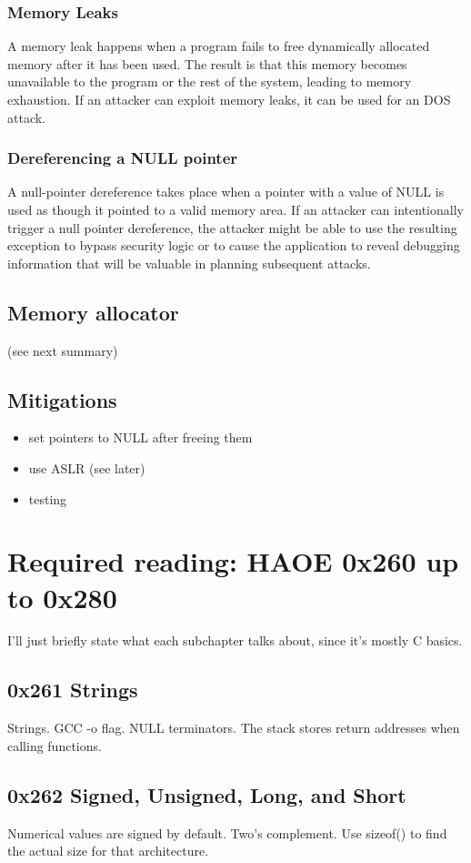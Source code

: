 \documentclass[letterpaper]{article}
\begin{document}
\subsubsection{Memory Leaks}
A memory leak happens when a program fails to free dynamically allocated memory after it has been used. The result is that this memory becomes unavailable to the program or the rest of the system, leading to memory exhaustion. If an attacker can exploit memory leaks, it can be used for an DOS attack.

\subsubsection{Dereferencing a NULL pointer}
A null-pointer dereference takes place when a pointer with a value of NULL is used as though it pointed to a valid memory area. If an attacker can intentionally trigger a null pointer dereference, the attacker might be able to use the resulting exception to bypass security logic or to cause the application to reveal debugging information that will be valuable in planning subsequent attacks.

\subsection{Memory allocator}
(see next summary)

\subsection{Mitigations}
\begin{itemize}
\item set pointers to NULL after freeing them
\item use ASLR (see later)
\item testing
\end{itemize}

\section{Required reading: HAOE 0x260 up to 0x280}
I'll just briefly state what each subchapter talks about, since it's mostly C basics.
\subsection*{0x261 Strings}
Strings. GCC -o flag. NULL terminators. The stack stores return addresses when calling functions.
\subsection*{0x262 Signed, Unsigned, Long, and Short}
Numerical values are signed by default. Two's complement. Use sizeof() to find the actual size for that architecture. 
\end{document}
